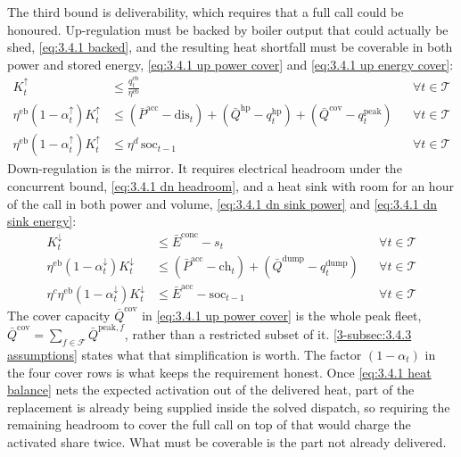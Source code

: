 The third bound is deliverability, which requires that a full call could be honoured. Up-regulation must be backed by boiler output that could actually be shed, \autoref{eq:3.4.1 backed}, and the resulting heat shortfall must be coverable in both power and stored energy, \autoref{eq:3.4.1 up power cover} and \autoref{eq:3.4.1 up energy cover}:
\begin{align}
    K^{\uparrow}_t &\leq \frac{q^{\text{eb}}_t}{\eta^{\text{eb}}} && \forall t \in \mathcal{T} \label{eq:3.4.1 backed} \\
    \eta^{\text{eb}} (1 - \alpha^{\uparrow}_t) K^{\uparrow}_t &\leq (\bar{P}^{\text{acc}} - \text{dis}_t) + (\bar{Q}^{\text{hp}} - q^{\text{hp}}_t) + (\bar{Q}^{\text{cov}} - q^{\text{peak}}_t) && \forall t \in \mathcal{T} \label{eq:3.4.1 up power cover} \\
    \eta^{\text{eb}} (1 - \alpha^{\uparrow}_t) K^{\uparrow}_t &\leq \eta^{d}\, \text{soc}_{t-1} && \forall t \in \mathcal{T} \label{eq:3.4.1 up energy cover}
\end{align}
Down-regulation is the mirror. It requires electrical headroom under the concurrent bound, \autoref{eq:3.4.1 dn headroom}, and a heat sink with room for an hour of the call in both power and volume, \autoref{eq:3.4.1 dn sink power} and \autoref{eq:3.4.1 dn sink energy}:
\begin{align}
    K^{\downarrow}_t &\leq \bar{E}^{\text{conc}} - s_t && \forall t \in \mathcal{T} \label{eq:3.4.1 dn headroom} \\
    \eta^{\text{eb}} (1 - \alpha^{\downarrow}_t) K^{\downarrow}_t &\leq (\bar{P}^{\text{acc}} - \text{ch}_t) + (\bar{Q}^{\text{dump}} - q^{\text{dump}}_t) && \forall t \in \mathcal{T} \label{eq:3.4.1 dn sink power} \\
    \eta^{c} \eta^{\text{eb}} (1 - \alpha^{\downarrow}_t) K^{\downarrow}_t &\leq \bar{E}^{\text{acc}} - \text{soc}_{t-1} && \forall t \in \mathcal{T} \label{eq:3.4.1 dn sink energy}
\end{align}
The cover capacity $\bar{Q}^{\text{cov}}$ in \autoref{eq:3.4.1 up power cover} is the whole peak fleet, $\bar{Q}^{\text{cov}} = \sum_{f \in \mathcal{F}} \bar{Q}^{\text{peak},f}$, rather than a restricted subset of it. \autoref{3-subsec:3.4.3 assumptions} states what that simplification is worth. The factor $(1 - \alpha_t)$ in the four cover rows is what keeps the requirement honest. Once \autoref{eq:3.4.1 heat balance} nets the expected activation out of the delivered heat, part of the replacement is already being supplied inside the solved dispatch, so requiring the remaining headroom to cover the full call on top of that would charge the activated share twice. What must be coverable is the part not already delivered.

